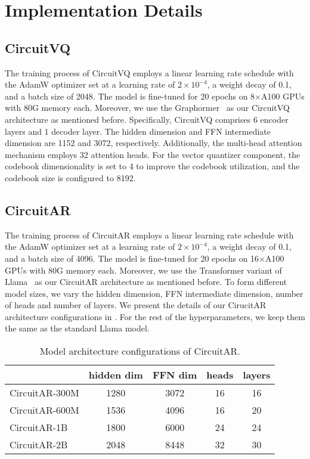\section{Implementation Details}

\subsection{CircuitVQ}
\label{appendix:circuitvq}
The training process of CircuitVQ employs a linear learning rate schedule with the AdamW optimizer set at a learning rate of $2 \times 10^{-4}$, a weight decay of 0.1, and a batch size of 2048.
The model is fine-tuned for 20 epochs on 8$\times$A100 GPUs with 80G memory each.
Moreover, we use the Graphormer~\cite{ying2021graphormer} as our CircuitVQ architecture as mentioned before. 
Specifically, CircuitVQ comprises 6 encoder layers and 1 decoder layer. 
The hidden dimension and FFN intermediate dimension are 1152 and 3072, respectively. 
Additionally, the multi-head attention mechanism employs 32 attention heads. 
For the vector quantizer component, the codebook dimensionality is set to 4 to improve the codebook utilization, and the codebook size is configured to 8192.

\subsection{CircuitAR}
\label{appendix:circuitar}
The training process of CircuitAR employs a linear learning rate schedule with the AdamW optimizer set at a learning rate of $2 \times 10^{-4}$, a weight decay of 0.1, and a batch size of 4096.
The model is fine-tuned for 20 epochs on 16$\times$A100 GPUs with 80G memory each.
Moreover, we use the Transformer variant of Llama~\cite{dubey2024llama3} as our CircuitAR architecture as mentioned before. 
To form different model sizes, we vary the hidden dimension, FFN intermediate dimension, number of heads and number of layers. 
We present the details of our CirucitAR architecture configurations in . 
For the rest of the hyperparameters, we keep them the same as the standard Llama model.
\begin{table}[!h]
\centering
\caption{Model architecture configurations of CircuitAR.}
\vskip 0.05in
\footnotesize
\begin{tabular}{l|c|c|c|c}
\toprule
& \textbf{hidden dim} & \textbf{FFN dim} & \textbf{heads} & \textbf{layers} \\
\midrule
CircuitAR-300M & 1280      & 3072    &  16      & 16 \\
CircuitAR-600M & 1536      & 4096    &  16      & 20 \\
CircuitAR-1B   & 1800      & 6000    &  24      & 24 \\
CircuitAR-2B   & 2048      & 8448    &  32      & 30 \\
\bottomrule
\end{tabular}
\label{tab:arch_config}
\end{table}


